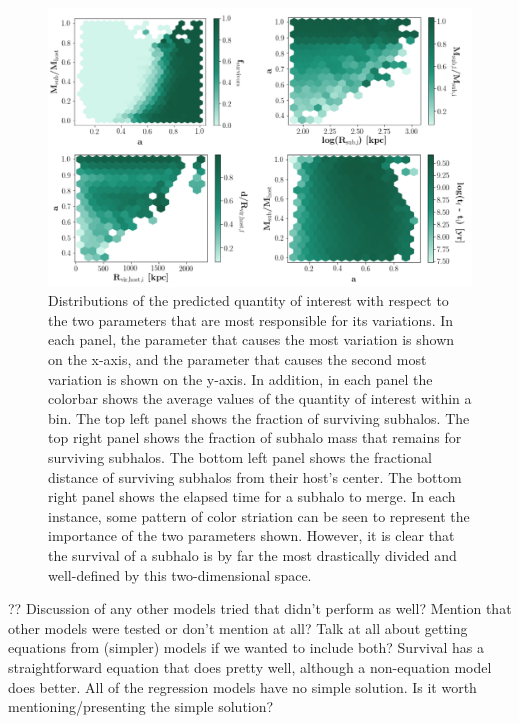 \documentclass[fleqn,usenatbib]{mnras}
\begin{document}
\begin{figure}
	\includegraphics[width=\textwidth]{Figures/bestSpaces_vartree}
    \caption{Distributions of the predicted quantity of interest with respect to the two parameters that are most responsible for its variations. In each panel, the parameter that causes the most variation is shown on the x-axis, and the parameter that causes the second most variation is shown on the y-axis. In addition, in each panel the colorbar shows the average values of the quantity of interest within a bin. The top left panel shows the fraction of surviving subhalos. The top right panel shows the fraction of subhalo mass that remains for surviving subhalos. The bottom left panel shows the fractional distance of surviving subhalos from their host's center. The bottom right panel shows the elapsed time for a subhalo to merge. In each instance, some pattern of color striation can be seen to represent the importance of the two parameters shown. However, it is clear that the survival of a subhalo is by far the most drastically divided and well-defined by this two-dimensional space. }
    \label{fig:bestSpaces_vartree}
\end{figure}

?? Discussion of any other models tried that didn't perform as well? Mention that other models were tested or don't mention at all? Talk at all about getting equations from (simpler) models if we wanted to include both? Survival has a straightforward equation that does pretty well, although a non-equation model does better. All of the regression models have no simple solution. Is it worth mentioning/presenting the simple solution?
\end{document}
